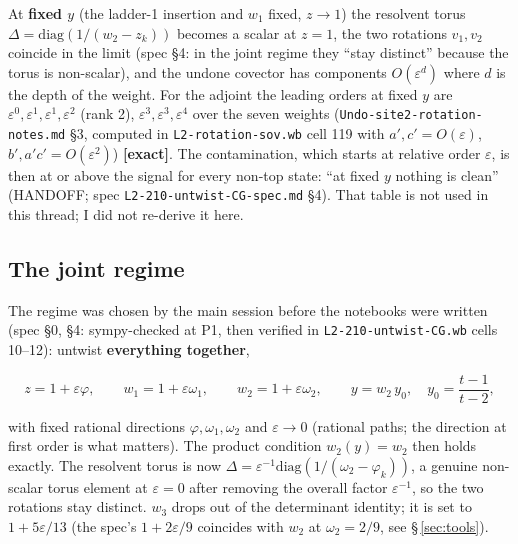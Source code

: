 \documentclass[10pt]{article}
\newcommand{\nb}[1]{\texttt{#1}}
\begin{document}
At \textbf{fixed $y$} (the ladder-1 insertion and $w_1$ fixed, $z\to1$) the resolvent torus $\Delta=\mathrm{diag}(1/(w_2-z_k))$ becomes a scalar at $z=1$, the two rotations $v_1,v_2$ coincide in the limit (spec \S{}4: in the joint regime they ``stay distinct'' because the torus is non-scalar), and the undone covector has components $O(\varepsilon^{d})$ where $d$ is the depth of the weight. For the adjoint the leading orders at fixed $y$ are $\varepsilon^0,\varepsilon^1,\varepsilon^1,\varepsilon^2$ (rank 2), $\varepsilon^3,\varepsilon^3,\varepsilon^4$ over the seven weights (\nb{Undo-\allowbreak{}site2-\allowbreak{}rotation-\allowbreak{}notes.\allowbreak{}md} \S{}3, computed in \nb{L2-\allowbreak{}rotation-\allowbreak{}sov.\allowbreak{}wb} cell 119 with $a',c'=O(\varepsilon)$, $b',a'c'=O(\varepsilon^2)$) \textbf{[exact]}. The contamination, which starts at relative order $\varepsilon$, is then at or above the signal for every non-top state: ``at fixed $y$ nothing is clean'' (HANDOFF; spec \nb{L2-\allowbreak{}210-\allowbreak{}untwist-\allowbreak{}CG-\allowbreak{}spec.\allowbreak{}md} \S{}4). That table is not used in this thread; I did not re-derive it here.

\subsection{The joint regime}\label{sec:jointreg}

The regime was chosen by the main session before the notebooks were written (spec \S{}0, \S{}4: sympy-checked at P1, then verified in \nb{L2-\allowbreak{}210-\allowbreak{}untwist-\allowbreak{}CG.\allowbreak{}wb} cells 10--12): untwist \textbf{everything together},

\[
z=1+\varepsilon\varphi,\qquad w_1=1+\varepsilon\omega_1,\qquad w_2=1+\varepsilon\omega_2,\qquad y=w_2\,y_0,\quad y_0=\frac{t-1}{t-2},
\]

with fixed rational directions $\varphi,\omega_1,\omega_2$ and $\varepsilon\to0$ (rational paths; the direction at first order is what matters). The product condition $w_2(y)=w_2$ then holds exactly. The resolvent torus is now $\Delta=\varepsilon^{-1}\mathrm{diag}(1/(\omega_2-\varphi_k))$, a genuine non-scalar torus element at $\varepsilon=0$ after removing the overall factor $\varepsilon^{-1}$, so the two rotations stay distinct. $w_3$ drops out of the determinant identity; it is set to $1+5\varepsilon/13$ (the spec's $1+2\varepsilon/9$ coincides with $w_2$ at $\omega_2=2/9$, see \S\,\ref{sec:tools}).
\end{document}

